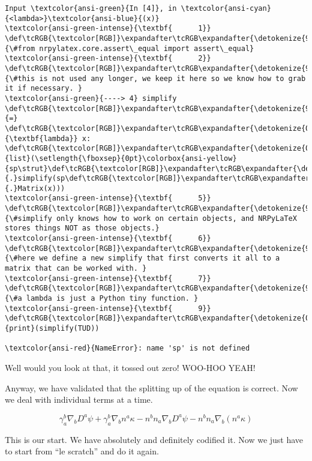 \documentclass[landscape,letterpaper,10pt,english]{article}
\begin{document}
\begin{Verbatim}[commandchars=\\\{\}, frame=single, framerule=2mm, rulecolor=\color{outerrorbackground}]
Input \textcolor{ansi-green}{In [4]}, in \textcolor{ansi-cyan}{<lambda>}\textcolor{ansi-blue}{(x)}
\textcolor{ansi-green-intense}{\textbf{      1}} \def\tcRGB{\textcolor[RGB]}\expandafter\tcRGB\expandafter{\detokenize{95,135,135}}{\#from nrpylatex.core.assert\_equal import assert\_equal}
\textcolor{ansi-green-intense}{\textbf{      2}} \def\tcRGB{\textcolor[RGB]}\expandafter\tcRGB\expandafter{\detokenize{95,135,135}}{\#this is not used any longer, we keep it here so we know how to grab it if necessary. }
\textcolor{ansi-green}{----> 4} simplify \def\tcRGB{\textcolor[RGB]}\expandafter\tcRGB\expandafter{\detokenize{98,98,98}}{=} \def\tcRGB{\textcolor[RGB]}\expandafter\tcRGB\expandafter{\detokenize{0,135,0}}{\textbf{lambda}} x: \def\tcRGB{\textcolor[RGB]}\expandafter\tcRGB\expandafter{\detokenize{0,135,0}}{list}(\setlength{\fboxsep}{0pt}\colorbox{ansi-yellow}{sp\strut}\def\tcRGB{\textcolor[RGB]}\expandafter\tcRGB\expandafter{\detokenize{98,98,98}}{.}simplify(sp\def\tcRGB{\textcolor[RGB]}\expandafter\tcRGB\expandafter{\detokenize{98,98,98}}{.}Matrix(x)))
\textcolor{ansi-green-intense}{\textbf{      5}} \def\tcRGB{\textcolor[RGB]}\expandafter\tcRGB\expandafter{\detokenize{95,135,135}}{\#simplify only knows how to work on certain objects, and NRPyLaTeX stores things NOT as those objects.}
\textcolor{ansi-green-intense}{\textbf{      6}} \def\tcRGB{\textcolor[RGB]}\expandafter\tcRGB\expandafter{\detokenize{95,135,135}}{\#here we define a new simplify that first converts it all to a matrix that can be worked with. }
\textcolor{ansi-green-intense}{\textbf{      7}} \def\tcRGB{\textcolor[RGB]}\expandafter\tcRGB\expandafter{\detokenize{95,135,135}}{\#a lambda is just a Python tiny function. }
\textcolor{ansi-green-intense}{\textbf{      9}} \def\tcRGB{\textcolor[RGB]}\expandafter\tcRGB\expandafter{\detokenize{0,135,0}}{print}(simplify(TUD))

\textcolor{ansi-red}{NameError}: name 'sp' is not defined
    \end{Verbatim}

    Well would you look at that, it tossed out zero! WOO-HOO YEAH!

Anyway, we have validated that the splitting up of the equation is
correct. Now we deal with individual terms at a time.

\[ \gamma^b_a\nabla_b D^a \psi + \gamma^b_a \nabla_b n^a \kappa -n^bn_a \nabla_b D^a \psi - n^bn_a \nabla_b (n^a \kappa) \]

This is our start. We have absolutely and definitely codified it. Now we
just have to start from ``le scratch'' and do it again.
\end{document}
